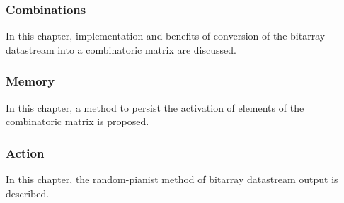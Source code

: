 \subsubsection{Combinations}
In this chapter, implementation and benefits of conversion of the bitarray datastream into a combinatoric matrix are discussed.
\subsubsection{Memory}
In this chapter, a method to persist the activation of  elements of the combinatoric matrix is proposed.
\subsubsection{Action}
In this chapter, the random-pianist method of bitarray datastream output is described.
